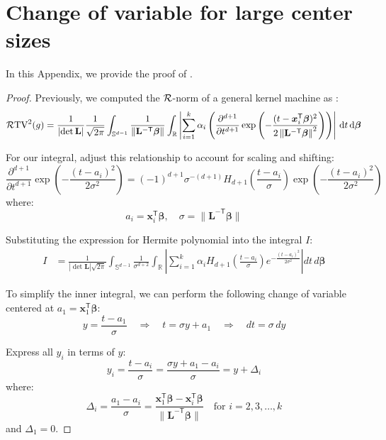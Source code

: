 \section{Change of variable for large center sizes}\label{app: cov}
In this Appendix, we provide the proof of .

\begin{proof}
    Previously, we computed the ${\mathcal{R}}$-norm of a general kernel machine as :
    \[
\mathcal{R}\mathrm{TV}^2(g) = \frac{1}{\left|\det \mathbf{L}\right|} \frac{1}{\sqrt{2\pi}} \int_{\mathbb{S}^{d-1}} \frac{1}{{\left\|\mathbf{L}^{-\mathsf{T}}\bm{\beta}\right\|}} 
    \int_\mathbb{R}
    \left|\sum_{i=1}^k \alpha_i  \left( {\frac{\partial^{d+1}}{\partial t^{d+1}} \exp \left( {-\frac{(t-\bm{x}_i^\mathsf{T}\bm{\beta})^2}{2\left\|\mathbf{L}^{-\mathsf{T}}\bm{\beta}\right\|^2}} \right) } \right) \right| \,\mathrm{d}t\,\mathrm{d}\bm{\beta}
\]


For our integral, adjust this relationship to account for scaling and shifting:
\begin{equation}
\frac{\partial^{d+1}}{\partial t^{d+1}} \exp\left( -\frac{(t - a_i)^2}{2 \sigma^2} \right) = (-1)^{d+1} \sigma^{-(d+1)} H_{d+1}\left( \frac{t - a_i}{\sigma} \right) \exp\left( -\frac{(t - a_i)^2}{2 \sigma^2} \right)
\end{equation}
where:
\[
a_i = \bm{x}_i^\mathsf{T}\bm{\beta}, \quad \sigma = \|\mathbf{L}^{-\mathsf{T}}\bm{\beta}\|
\]

Substituting the expression for Hermite polynomial into the integral \( I \):
\begin{align}
I &= \frac{1}{|\det \mathbf{L}| \sqrt{2\pi}} \int_{\mathbb{S}^{d-1}} \frac{1}{\sigma^{d+2}} \int_{\mathbb{R}} \left| \sum_{i=1}^k \alpha_i H_{d+1}\left( \frac{t - a_i}{\sigma} \right) e^{ -\frac{(t - a_i)^2}{2 \sigma^2} } \right| dt \, d\bm{\beta} \nonumber
\end{align}

To simplify the inner integral, we can perform the following change of variable centered at \( a_1 = \bm{x}_1^\mathsf{T}\bm{\beta} \):
\[
y = \frac{t - a_1}{\sigma} \quad \Rightarrow \quad t = \sigma y + a_1 \quad \Rightarrow \quad dt = \sigma \, dy
\]

Express all \( y_i \) in terms of \( y \):
\[
y_i = \frac{t - a_i}{\sigma} = \frac{\sigma y + a_1 - a_i}{\sigma} = y + \Delta_i
\]
where:
\[
\Delta_i = \frac{a_1 - a_i}{\sigma} = \frac{\bm{x}_1^\mathsf{T}\bm{\beta} - \bm{x}_i^\mathsf{T}\bm{\beta}}{\|\mathbf{L}^{-\mathsf{T}}\bm{\beta}\|}
\quad \text{for } i = 2, 3, \ldots, k
\]
and \( \Delta_1 = 0 \).


\end{proof}
